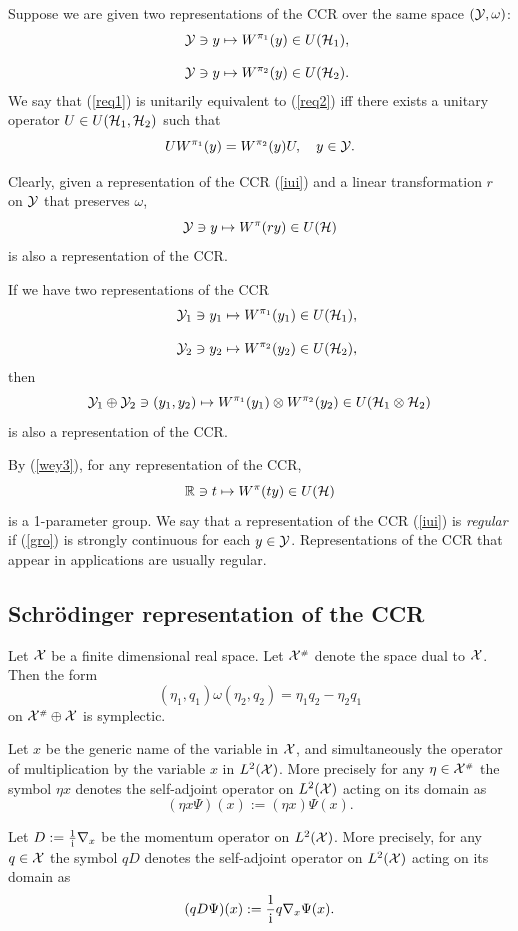 \documentclass{svmult}
\newcommand{\beq}{\begin{equation}}
\newcommand{\eeq}{\end{equation}}
\newcommand{\bea}{\begin{eqnarray}}
\newcommand{\eea}{\end{eqnarray}}
\def\rr{{\mathbb R}}
\def\cY{{\cal Y}}
\def\i{{\rm i}}
\def\cH{{\cal H}}
\def\cX{{\cal X}}
\def\cH{{\cal H}}
\def\t{{\scriptscriptstyle\#}}
\begin{document}
Suppose we are given two representations of the CCR over the same
 space $(\cY,\omega)$:
\bea
&&\cY\ni y\mapsto W^{\pi_1}(y)\in U(\cH_1),\label{req1}\\[3mm]
&&\cY\ni y\mapsto W^{\pi_2}(y)\in U(\cH_2).\label{req2}
\eea
We say that (\ref{req1}) is unitarily equivalent to (\ref{req2}) iff there
exists a unitary operator $U\in U(\cH_1,\cH_2)$ such that
\[UW^{\pi_1}(y)=W^{\pi_2}(y)U,\ \ \ y\in \cY.\]





Clearly, given a representation of the CCR (\ref{iui}) and  a linear
transformation  $r$ on $\cY$ that
preserves $\omega$,
\[\cY\ni y\mapsto W^\pi(ry)\in U(\cH)\]
is also a representation of the CCR.


If we have two  representations of the CCR 
\bea
&&\cY_1\ni y_1\mapsto W^{\pi_1}(y_1)\in U(\cH_1),\nonumber\\[3mm]
&&\cY_2\ni y_2\mapsto W^{\pi_2}(y_2)\in U(\cH_2),\nonumber
\eea
then
\[\cY_1\oplus\cY_2\ni(y_1,y_2)\mapsto W^{\pi_1}(y_1)\otimes
 W^{\pi_2}(y_2)\in U(\cH_1\otimes\cH_2)\]
 is also a
representation of the CCR.


By  (\ref{wey3}), for any representation of the CCR,
\beq\rr\ni t\mapsto W^\pi(ty)\in U(\cH) \label{gro}\eeq 
is a 1-parameter group. We say that  a representation of the CCR (\ref{iui}) is
{\em  regular} if
(\ref{gro}) is strongly continuous for each $y\in\cY$.
Representations of the CCR that  appear in applications are usually  regular.


\subsection{Schr\"odinger representation of the CCR}




 Let $\cX$ be a finite dimensional real space. Let $\cX^\t$ denote the space
 dual to $\cX$.
Then  the form
\beq(\eta_1,q_1)\omega(\eta_2,q_2)=\eta_1q_2-\eta_2 q_1\label{symp}\eeq
on $\cX^\t\oplus\cX$
is  symplectic.

Let $x$ be the generic name of the variable in $ \cX$, and simultaneously
 the 
 operator of multiplication by the variable $x$
 in $L^2(\cX)$.
More precisely
for any $\eta\in\cX^\t$ the symbol $\eta x$ denotes the
 self-adjoint operator on
 $L^2(\cX)$ acting on its domain as
\[(\eta x\Psi)(x):=(\eta x)\Psi(x).\]


 Let $D:=\frac1\i\nabla_x$ be the momentum operator on
 $L^2(\cX)$. 
More precisely, for any $q\in\cX$ the symbol
 $q D$ denotes the self-adjoint operator on  $L^2(\cX)$ acting
on its domain as 
\[(q D\Psi)(x):=\frac1\i q\nabla_x\Psi(x).\]
\end{document}
